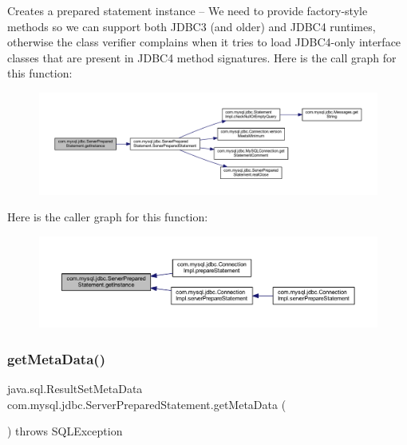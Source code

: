 Creates a prepared statement instance -- We need to provide factory-\/style methods so we can support both J\+D\+B\+C3 (and older) and J\+D\+B\+C4 runtimes, otherwise the class verifier complains when it tries to load J\+D\+B\+C4-\/only interface classes that are present in J\+D\+B\+C4 method signatures. Here is the call graph for this function\+:
\nopagebreak
\begin{figure}[H]
\begin{center}
\leavevmode
\includegraphics[width=350pt]{classcom_1_1mysql_1_1jdbc_1_1_server_prepared_statement_af8dc86dfa81a0998b2462a95b0f754a6_cgraph}
\end{center}
\end{figure}
Here is the caller graph for this function\+:
\nopagebreak
\begin{figure}[H]
\begin{center}
\leavevmode
\includegraphics[width=350pt]{classcom_1_1mysql_1_1jdbc_1_1_server_prepared_statement_af8dc86dfa81a0998b2462a95b0f754a6_icgraph}
\end{center}
\end{figure}
\mbox{\label{classcom_1_1mysql_1_1jdbc_1_1_server_prepared_statement_a85e380906b8d5a39f8c0aaee48d1a587}} 
\subsubsection{\texorpdfstring{get\+Meta\+Data()}{getMetaData()}}
{\footnotesize\ttfamily java.\+sql.\+Result\+Set\+Meta\+Data com.\+mysql.\+jdbc.\+Server\+Prepared\+Statement.\+get\+Meta\+Data (\begin{DoxyParamCaption}{ }\end{DoxyParamCaption}) throws S\+Q\+L\+Exception}

